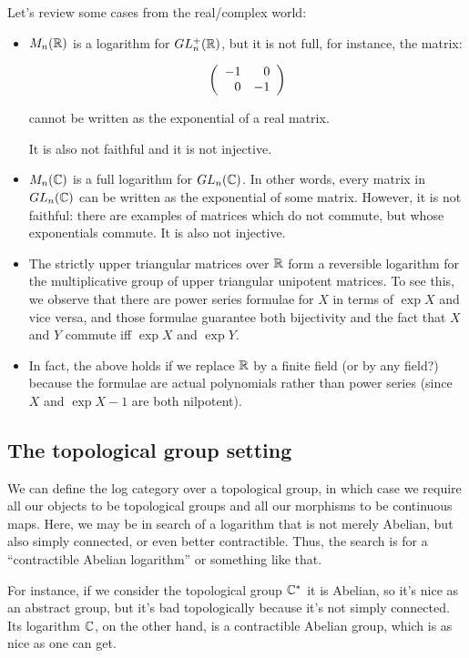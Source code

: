 \documentclass[a4paper]{amsart}
\begin{document}
Let's review some cases from the real/complex world:

\begin{itemize}

\item $M_n(\mathbb{R})$ is a logarithm for $GL_n^+(\mathbb{R})$, but it is not full,
  for instance, the matrix:

  $$\left(\begin{array}{rr} -1 & 0 \\ 0 & -1 \end{array}\right)$$

  cannot be written as the exponential of a real matrix.

  It is also not faithful and it is not injective.

\item $M_n(\mathbb{C})$ is a full logarithm for $GL_n(\mathbb{C})$. In other words,
  every matrix in $GL_n(\mathbb{C})$ can be written as the exponential of some
  matrix. However, it is not faithful: there are
  examples of matrices which do not commute, but whose exponentials
  commute. It is also not injective.

\item The strictly upper triangular matrices over $\mathbb{R}$ form a
  reversible logarithm for the multiplicative group of upper
  triangular unipotent matrices. To see this, we observe that there
  are power series formulae for $X$ in terms of $\exp X$ and vice
  versa, and those formulae guarantee both bijectivity and the fact
  that $X$ and $Y$ commute iff $\exp X$ and $\exp Y$.

\item In fact, the above holds if we replace $\mathbb{R}$ by a finite field
  (or by any field?) because the formulae are actual polynomials
  rather than power series (since $X$ and $\exp X - 1$ are both
  nilpotent).
\end{itemize}
\subsection{The topological group setting}

We can define the log category over a topological group, in which case
we require all our objects to be topological groups and all our
morphisms to be continuous maps. Here, we may be in search of a
logarithm that is not merely Abelian, but also simply connected, or
even better contractible. Thus, the search is for a ``contractible
Abelian logarithm'' or something like that.

For instance, if we consider the topological group $\mathbb{C}^*$ it is
Abelian, so it's nice as an abstract group, but it's bad topologically
because it's not simply connected. Its logarithm $\mathbb{C}$, on the other
hand, is a contractible Abelian group, which is as nice as one can
get.
\end{document}
